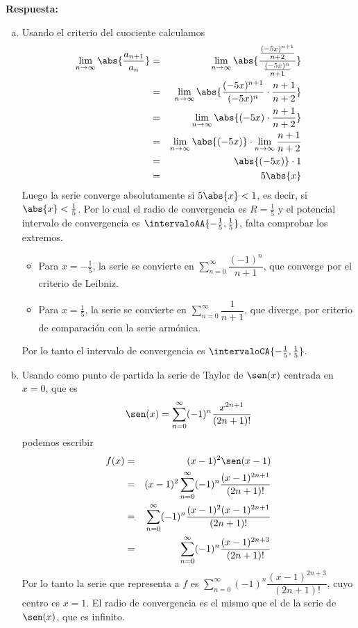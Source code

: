 \documentclass{article}
\begin{document}
\vspace{5mm}
\noindent\textbf{Respuesta:} 
\begin{enumerate}[a)]
  \item Usando el criterio del cuociente calculamos
    \begin{eqnarray*}
      \lim_{n\to\infty}\abs{\dfrac{a_{n+1}}{a_n}}
        &=& \lim_{n\to\infty}\abs{\dfrac{\frac{(-5x)^{n+1}}{n+2}}{\frac{(-5x)^n}{n+1}}}\\
        &=& \lim_{n\to\infty}\abs{\dfrac{(-5x)^{n+1}}{(-5x)^n}\cdot\dfrac{n+1}{n+2}}\\
        &=& \lim_{n\to\infty}\abs{(-5x)\cdot\dfrac{n+1}{n+2}}\\
        &=& \lim_{n\to\infty}\abs{(-5x)}\cdot\lim_{n\to\infty}\dfrac{n+1}{n+2}\\
        &=& \abs{(-5x)}\cdot 1\\
        &=& 5\abs{x}
    \end{eqnarray*}
    Luego la serie converge absolutamente si $5\abs{x}<1$, es decir, si $\abs{x}<\frac{1}{5}$. Por lo cual el radio de convergencia es $R=\frac{1}{5}$ y el potencial intervalo de convergencia es $\intervaloAA{-\frac{1}{5},\frac{1}{5}}$, falta comprobar los extremos.
      \begin{itemize}
        \item Para $x=-\frac{1}{5}$, la serie se convierte en $\sum_{n=0}^{\infty}\dfrac{(-1)^{n}}{n+1}$, que converge por el criterio de Leibniz.
        \item Para $x=\frac{1}{5}$, la serie se convierte en $\sum_{n=0}^{\infty}\dfrac{1}{n+1}$, que diverge, por criterio de comparación con la serie armónica.
      \end{itemize}
    Por lo tanto el intervalo de convergencia es $\intervaloCA{-\frac{1}{5},\frac{1}{5}}$.
  \newpage
  \item Usando como punto de partida la serie de Taylor de $\sen(x)$ centrada en $x=0$, que es
    $$\sen(x)=\sum_{n=0}^{\infty}(-1)^n\dfrac{x^{2n+1}}{(2n+1)!}$$
    podemos escribir
    \begin{eqnarray*}
      f(x) 
        &=& (x-1)^2\sen(x-1)\\
        &=& (x-1)^2\sum_{n=0}^{\infty}(-1)^n\dfrac{(x-1)^{2n+1}}{(2n+1)!}\\
        &=& \sum_{n=0}^{\infty}(-1)^n\dfrac{(x-1)^2(x-1)^{2n+1}}{(2n+1)!}\\
        &=& \sum_{n=0}^{\infty}(-1)^n\dfrac{(x-1)^{2n+3}}{(2n+1)!}
    \end{eqnarray*}
    Por lo tanto la serie que representa a $f$ es $\displaystyle\sum_{n=0}^{\infty}(-1)^n\dfrac{(x-1)^{2n+3}}{(2n+1)!}$, cuyo centro es $x=1$. El radio de convergencia es el mismo que el de la serie de $\sen(x)$, que es infinito.

\end{enumerate}
\end{document}
